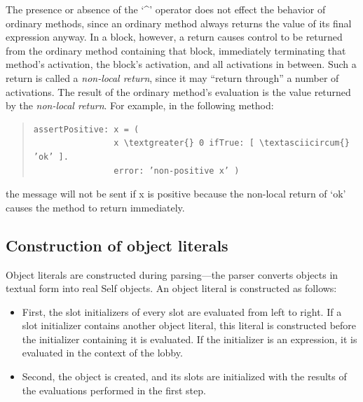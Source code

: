 \documentclass[letterpaper,10pt,english]{sphinxmanual}
\begin{document}
The presence or absence of the ‘\textasciicircum{}’ operator does not effect the behavior of ordinary methods, since an ordinary method always returns the value of its final expression anyway. In a block, however, a return causes control to be returned from the ordinary method containing that block, immediately terminating that method’s activation, the block’s activation, and all activations in between. Such a return is called a \emph{non-local return}, since it may “return through” a number of activations. The result of the ordinary method’s evaluation is the value returned by the \emph{non-local return}. For example, in the following method:
\begin{quote}

\begin{Verbatim}[commandchars=\\\{\}]
assertPositive: x = (
                x \textgreater{} 0 ifTrue: [ \textasciicircum{} ’ok’ ].
                error: ’non-positive x’ )
\end{Verbatim}
\end{quote}

the  message will not be sent if x is positive because the non-local return of ‘ok’ causes the  method to return immediately.


\subsection{Construction of object literals}
\label{langref:index-28}\label{langref:construction-of-object-literals}
Object literals are constructed during parsing—the parser converts objects in textual form into real Self objects.
An object literal is constructed as follows:
\begin{itemize}
\item {} 
First, the slot initializers of every slot are evaluated from left to right. If a slot initializer contains
another object literal, this literal is constructed before the initializer containing it is evaluated.
If the initializer is an expression, it is evaluated in the context of the lobby.

\item {} 
Second, the object is created, and its slots are initialized with the results of the evaluations performed
in the first step.

\end{itemize}
\end{document}

